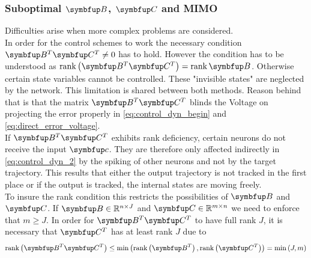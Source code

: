 \subsubsection{Suboptimal $\bmu{B}$, $\bmu{C}$ and \ac{MIMO}}
Difficulties arise when more complex problems are considered.\\
In order for the control schemes to work the necessary condition $\bmu{B}^T\bmu{C}^T \neq 0$ has to hold\cite{huang_dynamics_2019}. However the condition has to be understood as $\rank\left(\bmu{B}^T\bmu{C}^T\right) = \rank{\bmu{B}}$. Otherwise certain state variables cannot be controlled. These "invisible states" are neglected by the network. This limitation is shared between both methods. Reason behind that is
that the matrix $\bmu{B}^T\bmu{C}^T$ blinds the Voltage on projecting the error properly in \cref{eq:control_dyn_begin} and \cref{eq:direct_error_voltage}.\\
If $\bmu{B}^T\bmu{C}^T$ exhibits rank deficiency, certain neurons do not receive the input $\bmu{c}$. They are therefore only affected indirectly in \cref{eq:control_dyn_2} by the spiking of other neurons and not by the target trajectory. This results that either the output trajectory is not tracked in the first place or if the output is tracked, the internal states are moving freely.\\
To insure the rank condition this restricts the possibilities of $\bmu{B}$ and $\bmu{C}$.
If $\bmu{B} \in \mathbb{R}^{n\times J}$ and $\bmu{C} \in \mathbb{R}^{m\times n}$ we need to enforce that $m\geq J$. In order for $\bmu{B}^T\bmu{C}^T$ to have full rank $J$, it is necessary that $\bmu{C}^T$ has at least rank $J$ due to
\begin{equation}
	\rank\left(\bmu{B}^T\bmu{C}^T\right) \leq \min\left(\rank\left(\bmu{B}^T\right),\rank\left(\bmu{C}^T\right)\right) = \min\left(J,m\right)
\end{equation}

